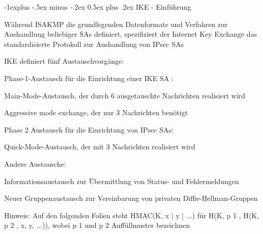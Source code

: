 \documentclass[a4paper]{article}
\makeatletter
\renewcommand{\subsection}{\@startsection{subsection}{2}{0mm}%
 {-1explus -.5ex minus -.2ex}%
 {0.5ex plus .2ex}%
 {\normalfont\normalsize\bfseries}}
\makeatother
\begin{document}
\begin{multicols}{3}
      \subsection{IKE - Einführung}
      \begin{itemize*}
            \item Während ISAKMP die grundlegenden Datenformate und Verfahren zur Aushandlung beliebiger SAs definiert, spezifiziert der Internet Key Exchange das standardisierte Protokoll zur Aushandlung von IPsec SAs
            \item IKE definiert fünf Austauschvorgänge:
            \begin{itemize*}
                  \item Phase-1-Austausch für die Einrichtung einer IKE SA :
                  \begin{itemize*}
                        \item Main-Mode-Austausch, der durch 6 ausgetauschte Nachrichten realisiert wird
                        \item Aggressive mode exchange, der nur 3 Nachrichten benötigt
                  \end{itemize*}
                  \item Phase 2 Austausch für die Einrichtung von IPsec SAs:
                  \begin{itemize*}
                        \item Quick-Mode-Austausch, der mit 3 Nachrichten realisiert wird
                  \end{itemize*}
                  \item Andere Austausche:
                  \begin{itemize*}
                        \item Informationsaustausch zur Übermittlung von Status- und Fehlermeldungen
                        \item Neuer Gruppenaustausch zur Vereinbarung von privaten Diffie-Hellman-Gruppen
                  \end{itemize*}
            \end{itemize*}
            \item Hinweis: Auf den folgenden Folien steht HMAC(K, x | y | ...) für H(K, p 1 , H(K, p 2 , x, y, ...)), wobei p 1 und p 2 Auffüllmuster bezeichnen
      \end{itemize*}


\end{multicols}
\end{document}
